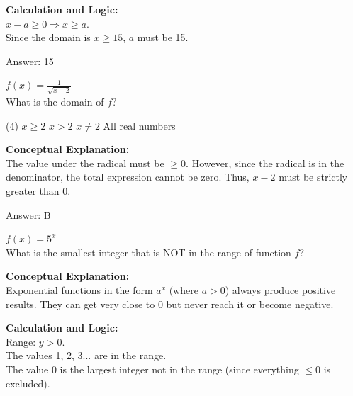 \documentclass[11pt,paper=a4,answers]{exam}
\begin{document}
\begin{questions}
\begin{solution}
\textbf{Calculation and Logic:} \\
$x - a \geq 0 \Rightarrow x \geq a$. \\
Since the domain is $x \geq 15$, $a$ must be 15.

\vspace{30pt}

Answer: \colorbox{yellow!100}{15}
\end{solution}

\vspace{40pt}

\question
$f(x) = \frac{1}{\sqrt{x-2}}$ \\
What is the domain of $f$?
\begin{tasks}(4)
    \task $x \geq 2$
    \task $x > 2$
    \task $x \neq 2$
    \task All real numbers
\end{tasks}

\begin{solution}
\textbf{Conceptual Explanation:} \\
The value under the radical must be $\geq 0$. However, since the radical is in the denominator, the total expression cannot be zero. Thus, $x-2$ must be strictly greater than 0.

\vspace{30pt}

Answer: \colorbox{yellow!100}{B}
\end{solution}

\vspace{40pt}

\question
$f(x) = 5^x$ \\
What is the smallest integer that is NOT in the range of function $f$?

\begin{solution}
\textbf{Conceptual Explanation:} \\
Exponential functions in the form $a^x$ (where $a > 0$) always produce positive results. They can get very close to 0 but never reach it or become negative.

\vspace{30pt}

\textbf{Calculation and Logic:} \\
Range: $y > 0$. \\
The values 1, 2, 3... are in the range. \\
The value 0 is the largest integer not in the range (since everything $\leq 0$ is excluded).


\end{solution}
\end{questions}
\end{document}
